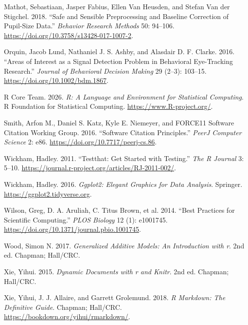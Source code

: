 \documentclass[
]{article}
\newlength{\cslhangindent}
\newenvironment{CSLReferences}[2] %
 {\begin{list}{}{%
  \setlength{\itemindent}{0pt}
  \setlength{\leftmargin}{0pt}
  \setlength{\parsep}{0pt}
  \ifodd #1
   \setlength{\leftmargin}{\cslhangindent}
   \setlength{\itemindent}{-1\cslhangindent}
  \fi
  \setlength{\itemsep}{#2\baselineskip}}}
 {\end{list}}
\begin{document}
\begin{CSLReferences}{1}{1}
Mathot, Sebastiaan, Jasper Fabius, Ellen Van Heusden, and Stefan Van der
Stigchel. 2018. {``Safe and Sensible Preprocessing and Baseline
Correction of Pupil-Size Data.''} \emph{Behavior Research Methods} 50:
94--106. \url{https://doi.org/10.3758/s13428-017-1007-2}.

Orquin, Jacob Lund, Nathaniel J. S. Ashby, and Alasdair D. F. Clarke.
2016. {``Areas of Interest as a Signal Detection Problem in Behavioral
Eye-Tracking Research.''} \emph{Journal of Behavioral Decision Making}
29 (2--3): 103--15. \url{https://doi.org/10.1002/bdm.1867}.

R Core Team. 2026. \emph{R: A Language and Environment for Statistical
Computing}. R Foundation for Statistical Computing.
\url{https://www.R-project.org/}.

Smith, Arfon M., Daniel S. Katz, Kyle E. Niemeyer, and FORCE11 Software
Citation Working Group. 2016. {``Software Citation Principles.''}
\emph{PeerJ Computer Science} 2: e86.
\url{https://doi.org/10.7717/peerj-cs.86}.

Wickham, Hadley. 2011. {``Testthat: Get Started with Testing.''}
\emph{The R Journal} 3: 5--10.
\url{https://journal.r-project.org/articles/RJ-2011-002/}.

Wickham, Hadley. 2016. \emph{Ggplot2: Elegant Graphics for Data
Analysis}. Springer. \url{https://ggplot2.tidyverse.org}.

Wilson, Greg, D. A. Aruliah, C. Titus Brown, et al. 2014. {``Best
Practices for Scientific Computing.''} \emph{PLOS Biology} 12 (1):
e1001745. \url{https://doi.org/10.1371/journal.pbio.1001745}.

Wood, Simon N. 2017. \emph{Generalized Additive Models: An Introduction
with r}. 2nd ed. Chapman; Hall/CRC.

Xie, Yihui. 2015. \emph{Dynamic Documents with r and Knitr}. 2nd ed.
Chapman; Hall/CRC.

Xie, Yihui, J. J. Allaire, and Garrett Grolemund. 2018. \emph{R
Markdown: The Definitive Guide}. Chapman; Hall/CRC.
\url{https://bookdown.org/yihui/rmarkdown/}.

\end{CSLReferences}
\end{document}

